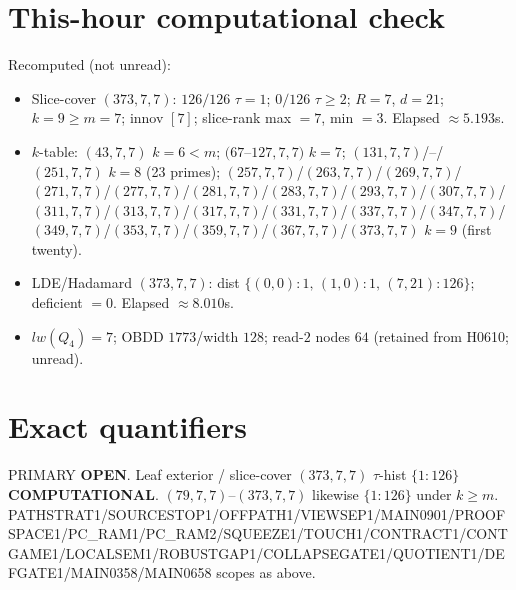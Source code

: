 \documentclass[11pt]{article}
\begin{document}
\section*{This-hour computational check}
Recomputed (not unread):
\begin{itemize}
\item Slice-cover $(373,7,7)$: $126/126$ $\tau{=}1$; $0/126$ $\tau{\ge}2$; $R{=}7$, $d{=}21$;
  $k{=}9{\ge}m{=}7$; innov $[7]$; slice-rank max $=7$, min $=3$. Elapsed $\approx5.193$s.
\item $k$-table: $(43,7,7)$ $k{=}6{<}m$; $(67$--$127,7,7)$ $k{=}7$;
  $(131,7,7)$/--/$(251,7,7)$ $k{=}8$ (23 primes); $(257,7,7)$/$(263,7,7)$/$(269,7,7)$/$(271,7,7)$/$(277,7,7)$/$(281,7,7)$/$(283,7,7)$/$(293,7,7)$/$(307,7,7)$/$(311,7,7)$/$(313,7,7)$/$(317,7,7)$/$(331,7,7)$/$(337,7,7)$/$(347,7,7)$/$(349,7,7)$/$(353,7,7)$/$(359,7,7)$/$(367,7,7)$/$(373,7,7)$ $k{=}9$ (first twenty).
\item LDE/Hadamard $(373,7,7)$: dist $\{(0,0){:}1,\,(1,0){:}1,\,(7,21){:}126\}$; deficient $=0$. Elapsed $\approx8.010$s.
\item $lw(Q_4)=7$; OBDD $1773$/width $128$; read-$2$ nodes $64$ (retained from H0610; unread).
\end{itemize}

\section*{Exact quantifiers}
PRIMARY \textbf{OPEN}. Leaf exterior / slice-cover $(373,7,7)$ $\tau$-hist $\{1{:}126\}$ \textbf{COMPUTATIONAL}.
$(79,7,7)$--$(373,7,7)$ likewise $\{1{:}126\}$ under $k{\ge}m$.
PATHSTRAT1/SOURCESTOP1/OFFPATH1/VIEWSEP1/MAIN0901/PROOFSPACE1/PC\_RAM1/PC\_RAM2/SQUEEZE1/TOUCH1/CONTRACT1/CONTGAME1/LOCALSEM1/ROBUSTGAP1/COLLAPSEGATE1/QUOTIENT1/DEFGATE1/MAIN0358/MAIN0658 scopes as above.
\end{document}
